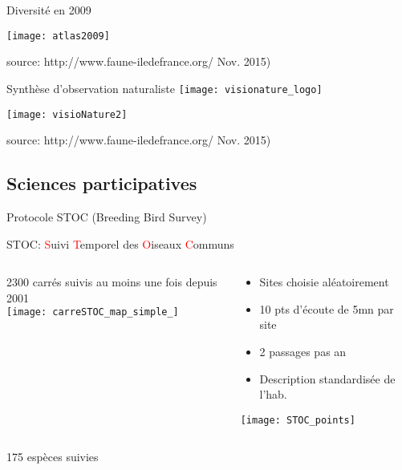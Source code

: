 \documentclass[10pt]{beamer}
\begin{document}
\begin{frame}{Diversité en 2009}
     \begin{center}
        \texttt{[image: atlas2009]}
  \end{center}
 \footnotesize{source: http://www.faune-iledefrance.org/ Nov. 2015)} 
\end{frame}


\begin{frame}{Synthèse d'observation naturaliste}
 \texttt{[image: visionature\_logo]}\\
    \begin{center}
        \texttt{[image: visioNature2]}
  \end{center}
  \footnotesize{source: http://www.faune-iledefrance.org/ Nov. 2015)}
\end{frame}

\subsection{Sciences participatives} 

\begin{frame}{Protocole STOC (Breeding Bird Survey)}
    \begin{center}
      STOC: \textcolor{red}{S}uivi \textcolor{red}{T}emporel des \textcolor{red}{O}iseaux \textcolor{red}{C}ommuns
  \end{center}
 \begin{columns}[c]
    \begin{column}[c]{0.5\textwidth}
      \begin{center}
      2300 carrés suivis au moins une fois depuis 2001 \\
    \texttt{[image: carreSTOC\_map\_simple\_]}
      \end{center}
    \end{column}
    \begin{column}[c]{0.5\textwidth}
    \begin{small}
      \begin{itemize}
      \item  Sites choisie aléatoirement
    \item 10 pts d'écoute de 5mn par site
    \item 2 passages pas an
    \item Description standardisée de l'hab.
    \end{itemize}
    \end{small}
     \begin{center}
       \texttt{[image: STOC\_points]}
  \end{center}
    \end{column}
  \end{columns}
 \begin{center}
  175 espèces suivies
  \end{center}
\end{frame}
\end{document}
